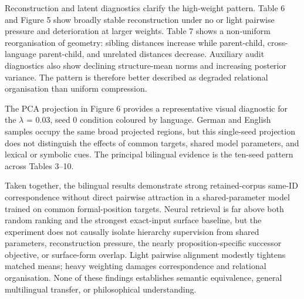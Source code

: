 \documentclass[webpdf,modern,medium,namedate]{oup-authoring-template}
\begin{document}
Reconstruction and latent diagnostics clarify the high-weight pattern. Table 6 and Figure 5 show broadly stable reconstruction under no or light pairwise pressure and deterioration at larger weights. Table 7 shows a non-uniform reorganisation of geometry: sibling distances increase while parent-child, cross-language parent-child, and unrelated distances decrease. Auxiliary audit diagnostics also show declining structure-mean norms and increasing posterior variance. The pattern is therefore better described as degraded relational organisation than uniform compression.

The PCA projection in Figure 6 provides a representative visual diagnostic for the $\lambda$ = 0.03, seed 0 condition coloured by language. German and English samples occupy the same broad projected regions, but this single-seed projection does not distinguish the effects of common targets, shared model parameters, and lexical or symbolic cues. The principal bilingual evidence is the ten-seed pattern across Tables 3--10.

Taken together, the bilingual results demonstrate strong retained-corpus same-ID correspondence without direct pairwise attraction in a shared-parameter model trained on common formal-position targets. Neural retrieval is far above both random ranking and the strongest exact-input surface baseline, but the experiment does not causally isolate hierarchy supervision from shared parameters, reconstruction pressure, the nearly proposition-specific successor objective, or surface-form overlap. Light pairwise alignment modestly tightens matched means; heavy weighting damages correspondence and relational organisation. None of these findings establishes semantic equivalence, general multilingual transfer, or philosophical understanding.
\end{document}
